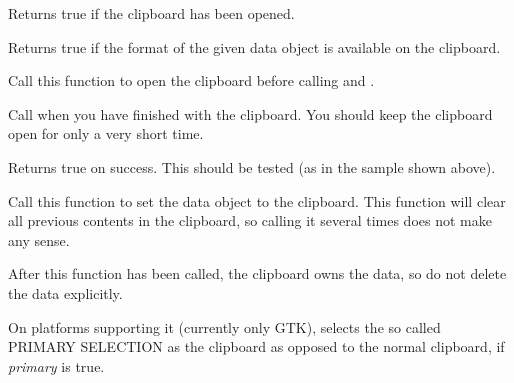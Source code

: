 
Returns true if the clipboard has been opened.

\label{wxclipboardissupported}


Returns true if the format of the given data object is available on the clipboard.

\label{wxclipboardopen}


Call this function to open the clipboard before calling  
and .

Call  when you have finished with the clipboard. You
should keep the clipboard open for only a very short time.

Returns true on success. This should be tested (as in the sample shown above).

\label{wxclipboardsetdata}


Call this function to set the data object to the clipboard. This function will
clear all previous contents in the clipboard, so calling it several times
does not make any sense.

After this function has been called, the clipboard owns the data, so do not delete
the data explicitly.



\label{wxclipboarduseprimary}


On platforms supporting it (currently only GTK), selects the so called
PRIMARY SELECTION as the clipboard as opposed to the normal clipboard,
if {\it primary} is true.


